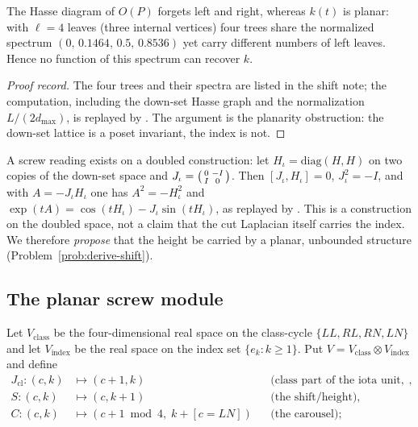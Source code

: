 \begin{nogo}\label{nogo:laplacian-index}
The Hasse diagram of $O(P)$ forgets left and right, whereas $k(t)$ is planar: with
$\ell=4$ leaves (three internal vertices) four trees share the normalized spectrum
$(0,\,0.1464,\,0.5,\,0.8536)$ yet carry different numbers of left leaves.  Hence no
function of this spectrum can recover $k$.
\end{nogo}

\begin{proof}[Proof record]
The four trees and their spectra are listed in the shift note; the computation,
including the down-set Hasse graph and the normalization $L/(2d_{\max})$, is replayed by
.  The argument is the planarity
obstruction: the down-set lattice is a poset invariant, the index is not.
\end{proof}

A screw reading exists on a doubled construction: let $H_{\iota}=\mathrm{diag}(H,H)$
on two copies of the down-set space and
$J_{\iota}=\begin{psmallmatrix}0&-I\\ I&0\end{psmallmatrix}$.  Then
$[J_{\iota},H_{\iota}]=0$, $J_{\iota}^{2}=-I$, and with $A=-J_{\iota}H_{\iota}$ one has
$A^{2}=-H_{\iota}^{2}$ and
$\exp(tA)=\cos(tH_{\iota})-J_{\iota}\sin(tH_{\iota})$, as replayed by
.  This is a construction on the doubled
space, not a claim that the cut Laplacian itself carries the index.  We therefore
\emph{propose} that the height be carried by a planar, unbounded structure
(Problem~\ref{prob:derive-shift}).

\subsection{The planar screw module}

\begin{construction}\label{con:screw-module}
Let $V_{\mathrm{class}}$ be the four-dimensional real space on the class-cycle
$\{LL,RL,RN,LN\}$ and let $V_{\mathrm{index}}$ be the real space on the index set
$\{e_k:k\ge 1\}$.  Put $V=V_{\mathrm{class}}\otimes V_{\mathrm{index}}$ and define
\begin{align*}
J_{\mathrm{cl}}:(c,k)&\longmapsto(c+1,k) &&\text{(class part of the iota unit, order four)},\\
S:(c,k)&\longmapsto(c,k+1) &&\text{(the shift/height)},\\
C:(c,k)&\longmapsto(c+1\bmod 4,\;k+[c=LN]) &&\text{(the carousel)};
\end{align*}
\end{construction}

